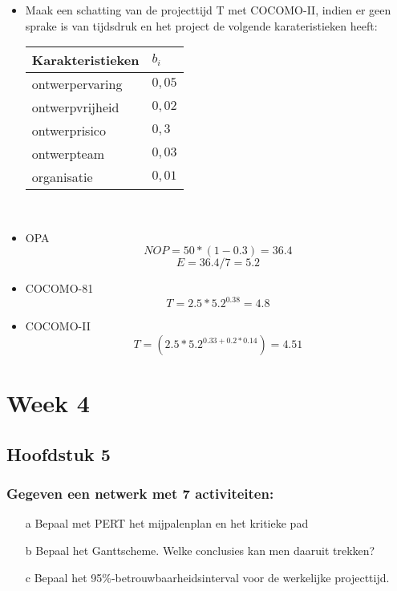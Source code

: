\documentclass[a4paper,titlepage]{artikel1}
\begin{document}
{\begin{itemize}
     \item Maak een schatting van de projecttijd T met COCOMO-II, indien er geen sprake is van tijdsdruk en het project de volgende karateristieken heeft:\\
       \begin{tabular}[]{|l|l|}
         \hline
         Karakteristieken & $b_i$ \\
         \hline
         ontwerpervaring & $0,05$ \\
         ontwerpvrijheid & $0,02$ \\
         ontwerprisico & $0,3$ \\
         ontwerpteam & $0,03$ \\
         organisatie & $0,01$ \\
         \hline
       \end{tabular}\\
   \end{itemize}
   }
   \begin{itemize}
    \item OPA
	  \begin{displaymath}
	   NOP=50*(1-0.3)=36.4
	  \end{displaymath} 
	  \begin{displaymath}
	   E=36.4/7=5.2
	  \end{displaymath}
    \item COCOMO-81
	  \begin{displaymath}
	   T=2.5*5.2^{0.38}=4.8
	  \end{displaymath}
    \item COCOMO-II
	  \begin{displaymath}
	   T=(2.5*5.2^{0.33+0.2*0.14})=4.51
	  \end{displaymath}
   \end{itemize}
   \section{Week 4}
   \subsection{Hoofdstuk 5}
   \subsubsection[Opdracht 1]{Gegeven een netwerk met 7 activiteiten:}
   \begin{itemize}
     \item[a] Bepaal met PERT het mijpalenplan en het kritieke pad
     \item[b] Bepaal het Ganttscheme. Welke conclusies kan men daaruit trekken?
     \item[c] Bepaal het 95\%-betrouwbaarheidsinterval voor de werkelijke projecttijd.
   \end{itemize}
\end{document}
